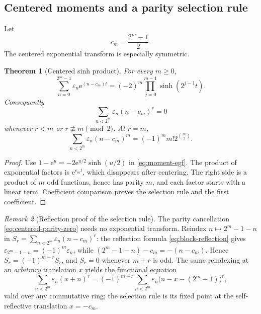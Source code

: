 \documentclass[11pt,oneside]{article}
\numberwithin{equation}{section}
\newtheorem{theorem}{Theorem}[section]
\theoremstyle{definition}
\theoremstyle{remark}
\newtheorem{remark}[theorem]{Remark}
\newcommand{\e}{\mathrm e}
\newcommand{\eps}{\varepsilon}
\begin{document}
\subsection{Centered moments and a parity selection rule}
\label{sec:centered-moments}

Let
\begin{equation}
  c_m=\frac{2^m-1}{2}.
  \label{eq:block-center}
\end{equation}
The centered exponential transform is especially symmetric.

\begin{theorem}[Centered sinh product]
\label{thm:centered-sinh}
For every \(m\ge0\),
\begin{equation}
  \boxed{
  \sum_{n=0}^{2^m-1}\eps_n\e^{(n-c_m)t}
  =(-2)^m\prod_{j=0}^{m-1}\sinh(2^{j-1}t).}
  \label{eq:centered-sinh}
\end{equation}
Consequently
\begin{equation}
  \boxed{
  \sum_{n<2^m}\eps_n(n-c_m)^r=0}
  \label{eq:centered-parity-zero}
\end{equation}
whenever \(r<m\) or \(r\not\equiv m\pmod2\).  At \(r=m\),
\begin{equation}
  \sum_{n<2^m}\eps_n(n-c_m)^m
  =(-1)^mm!2^{\binom m2}.
  \label{eq:centered-first}
\end{equation}
\end{theorem}

\begin{proof}
Use
\(1-\e^u=-2\e^{u/2}\sinh(u/2)\) in
\eqref{eq:moment-egf}.  The product of exponential factors is
\(\e^{c_mt}\), which disappears after centering.  The right side is a product
of \(m\) odd functions, hence has parity \(m\), and each factor starts with a
linear term.  Coefficient comparison proves the selection rule and the first
coefficient.
\end{proof}

\begin{remark}[Reflection proof of the selection rule]
\label{rem:reflection-parity}
The parity cancellation \eqref{eq:centered-parity-zero} needs no
exponential transform.  Reindex \(n\mapsto2^m-1-n\) in
\(S_r=\sum_{n<2^m}\eps_n(n-c_m)^r\): the reflection formula
\eqref{eq:block-reflection} gives \(\eps_{2^m-1-n}=(-1)^m\eps_n\),
while \((2^m-1-n)-c_m=-(n-c_m)\).  Hence \(S_r=(-1)^{m+r}S_r\), and
\(S_r=0\) whenever \(m+r\) is odd.  The same reindexing at an
\emph{arbitrary} translation \(x\) yields the functional equation
\[
 \sum_{n<2^m}\eps_n(x+n)^r
 =(-1)^{m+r}\sum_{n<2^m}\eps_n\bigl(n-x-(2^m-1)\bigr)^r,
\]
valid over any commutative ring; the selection rule is its fixed point at
the self-reflective translation \(x=-c_m\).
\end{remark}
\end{document}
